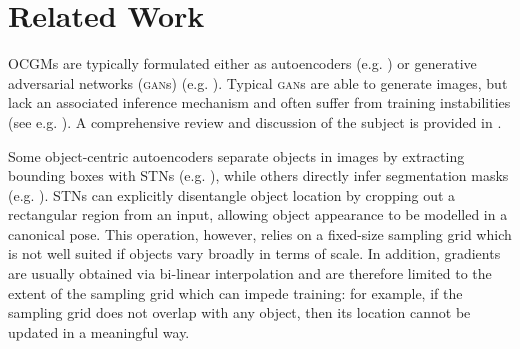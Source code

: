 \documentclass{article}
\begin{document}
\section{Related Work}

OCGMs are typically formulated either as autoencoders (e.g. \cite{huang2015efficient,eslami2016attend,kosiorek2018sqair,xu2018multi,crawford2019spatially,greff2016tagger,greff2017neural,van2018relational,burgess2019monet,greff2019multi,kosiorek2019stacked,veerapaneni2020entity,engelcke2020genesis,engelcke2020reconstruction,anciukevicius2020object,lin2020space,jiang2020scalor,yang2020learning,bear2020learning,locatello2020object}) or generative adversarial networks (\textsc{gan}s) (e.g. \cite{van2018case,chen2019unsupervised,bielski2019emergence,arandjelovic2019object,azadi2019compositional,nguyen2020blockgan,ehrhardt2020relate,niemeyer2020giraffe}).
Typical \textsc{gan}s are able to generate images, but lack an associated inference mechanism and often suffer from training instabilities (see e.g. \cite{goodfellow2014generative,brock2018large}).
A comprehensive review and discussion of the subject is provided in \citet{greff2020binding}.

Some object-centric autoencoders separate objects in images by extracting bounding boxes with STNs (e.g. \cite{huang2015efficient,eslami2016attend,kosiorek2018sqair,xu2018multi,crawford2019spatially,lin2020space,jiang2020scalor}), while others directly infer segmentation masks (e.g. \cite{greff2016tagger,greff2017neural,van2018relational,burgess2019monet,greff2019multi,kosiorek2019stacked,veerapaneni2020entity,engelcke2020genesis,engelcke2020reconstruction,locatello2020object}).
STNs can explicitly disentangle object location by cropping out a rectangular region from an input, allowing object appearance to be modelled in a canonical pose.
This operation, however, relies on a fixed-size sampling grid which is not well suited if objects vary broadly in terms of scale.
In addition, gradients are usually obtained via bi-linear interpolation and are therefore limited to the extent of the sampling grid which can impede training: for example, if the sampling grid does not overlap with any object, then its location cannot be updated in a meaningful way.
\end{document}
